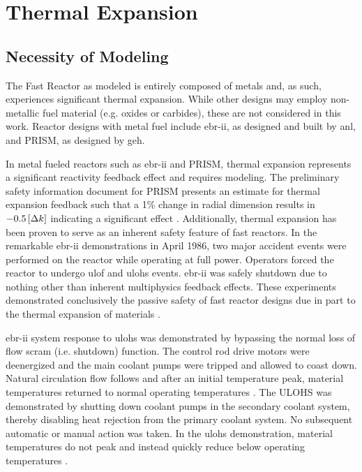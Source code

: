 \chapter{Thermal Expansion}
\label{ch:thermalExpansion}

\section{Necessity of Modeling}
  The Fast Reactor as modeled is entirely composed of
  metals and, as such, experiences significant thermal expansion. While other 
  designs may employ non-metallic fuel material (e.g. oxides or carbides), these 
  are not considered in this work. Reactor designs with metal fuel include 
  \gls{ebr-ii}, as designed and built by \gls{anl}, and PRISM, as designed by 
  \gls{geh}.

  In metal fueled reactors such as \gls{ebr-ii} and PRISM, thermal expansion 
  represents a significant reactivity feedback effect and requires modeling. 
  The preliminary safety information document for PRISM presents an 
  estimate for thermal expansion feedback such that a 1\% change in radial 
  dimension results in $-0.5 \left[\text{{$\Delta k$}}\right]$ indicating a significant effect 
  \cite{GEFR793}. Additionally, thermal expansion has been proven to serve as an 
  inherent safety feature of fast reactors. In the remarkable \gls{ebr-ii} 
  demonstrations in April 1986, two major accident events were performed on the 
  reactor while operating at full power. Operators forced the reactor to undergo 
  \gls{ulof} and \gls{ulohs} events. \gls{ebr-ii} was safely shutdown due to 
  nothing other than inherent multiphysics feedback effects. These experiments 
  demonstrated conclusively the passive safety of fast reactor designs due in 
  part to the thermal expansion of materials \cite{PlentifulEnergy}.

  \gls{ebr-ii} system response to \gls{ulohs} was demonstrated by bypassing the 
  normal loss of flow scram (i.e. shutdown) function. The control rod drive 
  motors were deenergized and the main coolant pumps were tripped and allowed to 
  coast down.  Natural circulation flow follows and after an initial temperature 
  peak, material temperatures returned to normal operating temperatures 
  \cite{ebriitests}. The ULOHS was demonstrated by shutting down coolant pumps 
  in the secondary coolant system, thereby disabling heat rejection from the 
  primary coolant system. No subsequent automatic or manual action was taken. In 
  the \gls{ulohs} demonstration, material temperatures do not peak and instead 
  quickly reduce below operating temperatures \cite{ebriitests}.

